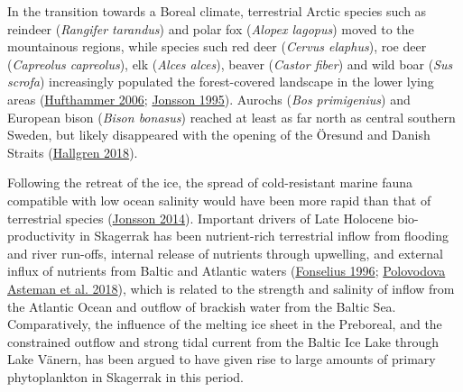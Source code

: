 \documentclass[
  12pt,
  a4paper,
  oneside]{book}
\begin{document}
In the transition towards a Boreal climate, terrestrial Arctic species such as reindeer (\emph{Rangifer tarandus}) and polar fox (\emph{Alopex lagopus}) moved to the mountainous regions, while species such red deer (\emph{Cervus elaphus}), roe deer (\emph{Capreolus capreolus}), elk (\emph{Alces alces}), beaver (\emph{Castor fiber}) and wild boar (\emph{Sus scrofa}) increasingly populated the forest-covered landscape in the lower lying areas (\protect\hyperlink{ref-hufthammer2006}{Hufthammer 2006}; \protect\hyperlink{ref-jonsson1995}{Jonsson 1995}). Aurochs (\emph{Bos primigenius}) and European bison (\emph{Bison bonasus}) reached at least as far north as central southern Sweden, but likely disappeared with the opening of the Öresund and Danish Straits (\protect\hyperlink{ref-hallgren2018}{Hallgren 2018}).

Following the retreat of the ice, the spread of cold-resistant marine fauna compatible with low ocean salinity would have been more rapid than that of terrestrial species (\protect\hyperlink{ref-jonsson2014}{Jonsson 2014}). Important drivers of Late Holocene bio-productivity in Skagerrak has been nutrient-rich terrestrial inflow from flooding and river run-offs, internal release of nutrients through upwelling, and external influx of nutrients from Baltic and Atlantic waters (\protect\hyperlink{ref-fonselius1996}{Fonselius 1996}; \protect\hyperlink{ref-polovodovaasteman2018}{Polovodova Asteman et al. 2018}), which is related to the strength and salinity of inflow from the Atlantic Ocean and outflow of brackish water from the Baltic Sea. Comparatively, the influence of the melting ice sheet in the Preboreal, and the constrained outflow and strong tidal current from the Baltic Ice Lake through Lake Vänern, has been argued to have given rise to large amounts of primary phytoplankton in Skagerrak in this period.
\end{document}
